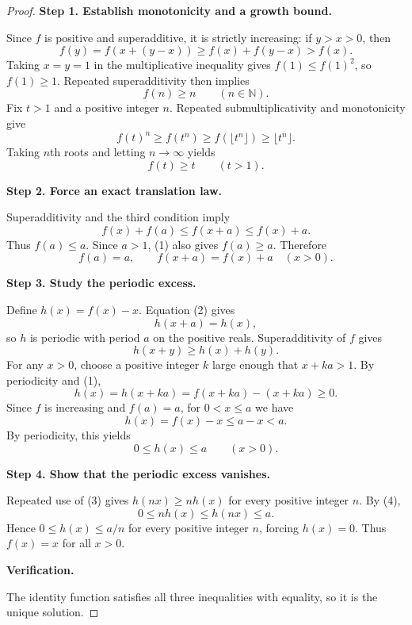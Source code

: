 
\begin{dlsummary}[title={\bfseries Solution 3. The Periodic Excess},breakable]

\begin{proof}
\textbf{Step 1. Establish monotonicity and a growth bound.}

Since $f$ is positive and superadditive, it is strictly increasing:
if $y>x>0$, then
\[
f(y)=f(x+(y-x))\geq f(x)+f(y-x)>f(x).
\]
Taking $x=y=1$ in the multiplicative inequality gives
$f(1)\leq f(1)^2$, so $f(1)\geq1$. Repeated superadditivity then
implies
\[
f(n)\geq n\qquad(n\in\mathbb N).
\]
Fix $t>1$ and a positive integer $n$. Repeated submultiplicativity
and monotonicity give
\[
f(t)^n\geq f(t^n)\geq f(\lfloor t^n\rfloor)
\geq\lfloor t^n\rfloor.
\]
Taking $n$th roots and letting $n\to\infty$ yields
\[
f(t)\geq t\qquad(t>1). \tag{1}
\]

\medskip
\noindent
\textbf{Step 2. Force an exact translation law.}

Superadditivity and the third condition imply
\[
f(x)+f(a)\leq f(x+a)\leq f(x)+a.
\]
Thus $f(a)\leq a$. Since $a>1$, (1) also gives $f(a)\geq a$.
Therefore
\[
f(a)=a,\qquad f(x+a)=f(x)+a\quad(x>0). \tag{2}
\]

\medskip
\noindent
\textbf{Step 3. Study the periodic excess.}

Define $h(x)=f(x)-x$. Equation (2) gives
\[
h(x+a)=h(x),
\]
so $h$ is periodic with period $a$ on the positive reals.
Superadditivity of $f$ gives
\[
h(x+y)\geq h(x)+h(y). \tag{3}
\]
For any $x>0$, choose a positive integer $k$ large enough that
$x+ka>1$. By periodicity and (1),
\[
h(x)=h(x+ka)=f(x+ka)-(x+ka)\geq0.
\]
Since $f$ is increasing and $f(a)=a$, for $0<x\leq a$ we have
\[
h(x)=f(x)-x\leq a-x<a.
\]
By periodicity, this yields
\[
0\leq h(x)\leq a\qquad(x>0). \tag{4}
\]

\medskip
\noindent
\textbf{Step 4. Show that the periodic excess vanishes.}

Repeated use of (3) gives $h(nx)\geq n h(x)$ for every positive
integer $n$. By (4),
\[
0\leq n h(x)\leq h(nx)\leq a.
\]
Hence $0\leq h(x)\leq a/n$ for every positive integer $n$, forcing
$h(x)=0$. Thus $f(x)=x$ for all $x>0$.

\medskip
\noindent
\textbf{Verification.}

The identity function satisfies all three inequalities with equality,
so it is the unique solution.
\end{proof}

\end{dlsummary}